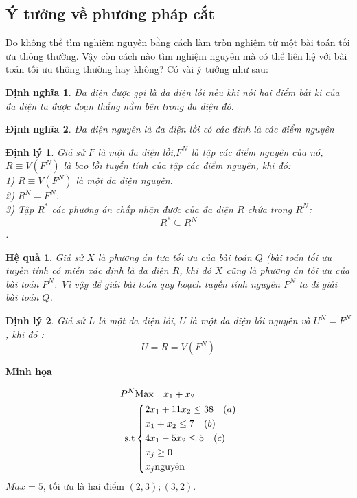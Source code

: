 \documentclass[12pt,a4paper]{report}
\newtheorem{dn}{Định nghĩa}[chapter]
\newtheorem{dl}{Định lý}[chapter]
\newtheorem{hq}{Hệ quả}[chapter]
\begin{document}
\subsection{ Ý tưởng về phương pháp cắt}
Do không thể tìm nghiệm nguyên bằng cách làm tròn nghiệm từ một bài toán tối ưu thông thường. Vậy còn cách nào tìm nghiệm nguyên mà có thể liên hệ với bài toán tối ưu thông thường hay không? Có vài ý tưởng như sau:\\
\begin{dn}
    Đa diện được gọi là đa diện lồi nếu khi nối hai điểm bất kì của đa diện ta được đoạn thẳng nằm bên trong đa diện đó.
\end{dn}
\begin{dn}
    Đa diện nguyên là đa diện lồi có các đỉnh là các điểm nguyên
\end{dn}
\begin{dl}
   Giả sử $F$ là một đa diện lồi,$F^N$ là tập các điểm nguyên của nó, 
$R\equiv V(F^N)$ là bao lồi tuyến tính của tập các điểm nguyên, khi đó:\\

    1) $R\equiv V(F^N)$ là một đa diện nguyên.\\
    2) $R^N=F^N$.\\
    3) Tập $R^\ast$ các phương án chấp nhận được của đa diện $R$ chứa trong $R^N$:\\
    $$R^{\ast} \subseteq R^N$$.\\
\end{dl}

\begin{hq}
     Giả sử $X$  là phương án tựa tối ưu của bài toán $Q$ (bài toán tối ưu tuyến tính có miền xác định là đa diện $R$, khi đó $X$ cũng là phương án tối ưu của bài toán  $P^N$. Vì vậy để giải bài toán quy hoạch tuyến tính nguyên $P^N$ ta đi giải bài toán $Q$.\\
\end{hq}
\begin{dl}
 Giả sử $L$ là một đa diện lồi, $U$ là một đa diện lồi nguyên và $U^N= F^N$, khi đó :
 $$U = R = V(F^N)$$
    \end{dl}
    \textbf{Minh họa}

    \begin{equation}
     \begin{split}
      P^N    & {\rm{Max}} \quad x_1 +x_2\\
          \rm{s.t} &\left\{\begin{split}
            & 2x_1+11x_2 \le 38 \quad  (a)\\
            &x_1+x_2 \le 7  \quad (b)\\
            &4x_1-5x_2 \le 5 \quad (c)\\
           & x_j \ge 0\\
            & x_j \text{nguyên}\\
           \end{split}\right.
       \end{split}
   \end{equation}
   $Max=5$, tối ưu là hai điểm $(2,3); (3,2)$.\\
\end{document}
